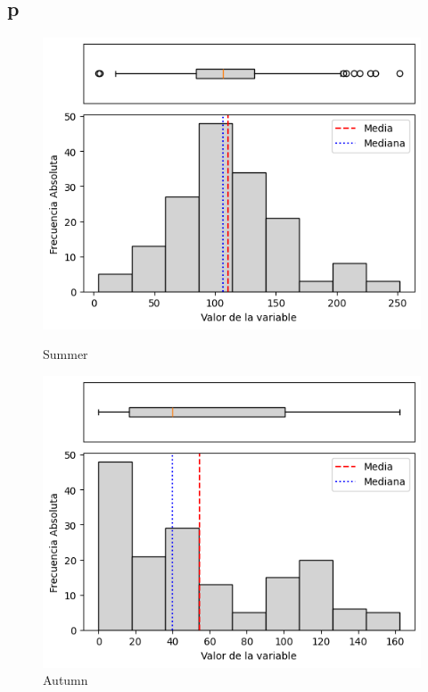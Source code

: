 \subsection{\gls{p} }

\begin{figure}[htbp]
\centering
\begin{minipage}{0.30\textwidth}
  \includegraphics[width=\linewidth]{resultados/por_estacion_del_anio/boxplot_clases_por_estacion/Andahuaylas/P_HistBoxplot_Summer.png}
  \caption*{Summer}
\end{minipage}
\hfill
\begin{minipage}{0.30\textwidth}
  \includegraphics[width=\linewidth]{resultados/por_estacion_del_anio/boxplot_clases_por_estacion/Andahuaylas/P_HistBoxplot_Autumn.png}
  \caption*{Autumn}
\end{minipage}


\end{figure}
